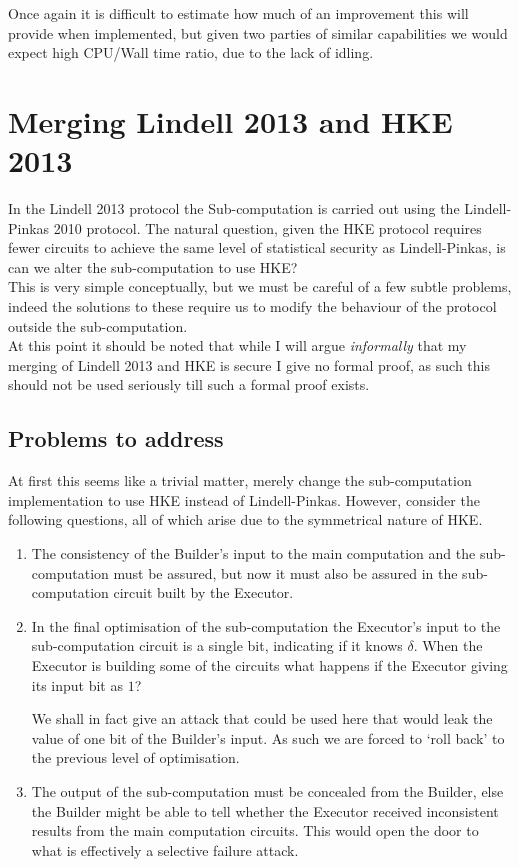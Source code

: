 \documentclass[ %
                    author={Nicholas Tutte},
                supervisor={Prof. Nigel Smart},
                    degree={MEng},
                     title={Secure Two Party Computation},
                  subtitle={A practical comparison of recent protocols},
                      type={Research - GG1K},
                      year={2015} ]{dissertation}
\begin{document}
				Once again it is difficult to estimate how much of an improvement this will provide when implemented, but given two parties of similar capabilities we would expect high CPU/Wall time ratio, due to the lack of idling.


		\section{Merging Lindell 2013 and HKE 2013}
			In the Lindell 2013 protocol the Sub-computation is carried out using the Lindell-Pinkas 2010 protocol. The natural question, given the HKE protocol requires fewer circuits to achieve the same level of statistical security as Lindell-Pinkas, is can we alter the sub-computation to use HKE?\\

			This is very simple conceptually, but we must be careful of a few subtle problems, indeed the solutions to these require us to modify the behaviour of the protocol outside the sub-computation.\\

			At this point it should be noted that while I will argue \emph{informally} that my merging of Lindell 2013 and HKE is secure I give no formal proof, as such this should not be used seriously till such a formal proof exists.

			\subsection{Problems to address}
				At first this seems like a trivial matter, merely change the sub-computation implementation to use HKE instead of Lindell-Pinkas. However, consider the following questions, all of which arise due to the symmetrical nature of HKE.

				\begin{enumerate}
					\item The consistency of the Builder's input to the main computation and the sub-computation must be assured, but now it must also be assured in the sub-computation circuit built by the Executor.

					\item In the final optimisation of the sub-computation the Executor's input to the sub-computation circuit is a single bit, indicating if it knows $\delta$. When the Executor is building some of the circuits what happens if the Executor giving its input bit as $1$?

					We shall in fact give an attack that could be used here that would leak the value of one bit of the Builder's input. As such we are forced to `roll back' to the previous level of optimisation.

					\item The output of the sub-computation must be concealed from the Builder, else the Builder might be able to tell whether the Executor received inconsistent results from the main computation circuits. This would open the door to what is effectively a selective failure attack.

				\end{enumerate}
\end{document}
